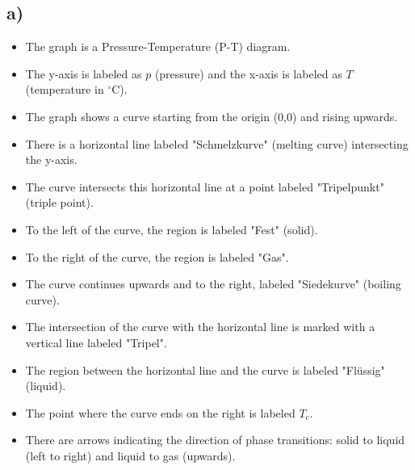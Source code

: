 

\subsection*{a)}

\begin{itemize}
    \item The graph is a Pressure-Temperature (P-T) diagram.
    \item The y-axis is labeled as $p$ (pressure) and the x-axis is labeled as $T$ (temperature in $^\circ$C).
    \item The graph shows a curve starting from the origin (0,0) and rising upwards.
    \item There is a horizontal line labeled "Schmelzkurve" (melting curve) intersecting the y-axis.
    \item The curve intersects this horizontal line at a point labeled "Tripelpunkt" (triple point).
    \item To the left of the curve, the region is labeled "Fest" (solid).
    \item To the right of the curve, the region is labeled "Gas".
    \item The curve continues upwards and to the right, labeled "Siedekurve" (boiling curve).
    \item The intersection of the curve with the horizontal line is marked with a vertical line labeled "Tripel".
    \item The region between the horizontal line and the curve is labeled "Flüssig" (liquid).
    \item The point where the curve ends on the right is labeled $T_c$.
    \item There are arrows indicating the direction of phase transitions: solid to liquid (left to right) and liquid to gas (upwards).
\end{itemize}
